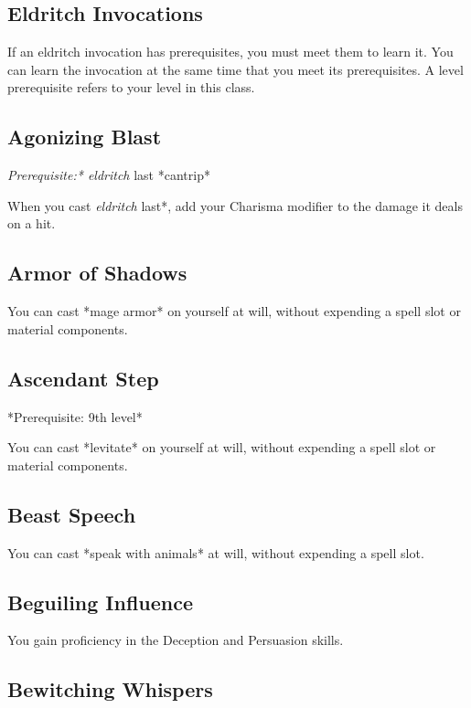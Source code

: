 \subsection{Eldritch Invocations}

If an eldritch invocation has prerequisites, you must meet them to learn it. You can learn the invocation at the same time that you meet its prerequisites. A level prerequisite refers to your level in this class.

\subsection{Agonizing Blast}

\textit{Prerequisite:* eldritch }last *cantrip*

When you cast \textit{eldritch }last*, add your Charisma modifier to the damage it deals on a hit.

\subsection{Armor of Shadows}

You can cast *mage armor* on yourself at will, without expending a spell slot or material components.

\subsection{Ascendant Step}

*Prerequisite: 9th level*

You can cast *levitate* on yourself at will, without expending a spell slot or material components.

\subsection{Beast Speech}

You can cast *speak with animals* at will, without expending a spell slot.

\subsection{Beguiling Influence}

You gain proficiency in the Deception and Persuasion skills.

\subsection{Bewitching Whispers}

